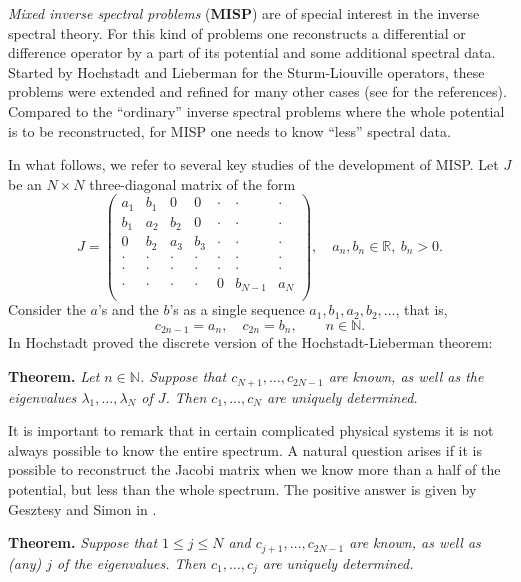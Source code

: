 \documentclass{amsart}
\begin{document}
{\it Mixed inverse spectral problems} ({\bf MISP}) are of special
interest in the inverse spectral theory. For this kind of problems
one reconstructs a differential or difference operator by a part of
its potential and some additional spectral data. Started by
Hochstadt and Lieberman \cite{HL} for the Sturm-Liouville operators,
these problems were extended and refined for many other cases (see
\cite{Chu-Golub} for the references). Compared to the ``ordinary''
inverse spectral problems where the whole potential is to be
reconstructed, for MISP one needs to know ``less'' spectral data.

In what follows, we refer to several key studies of the
development of MISP. Let $J$ be an $N\times N$ three-diagonal
matrix of the form
$$
J=\begin{pmatrix} a_1 & b_1 & 0 & 0 & \cdot & \cdot & \cdot \\
b_1 & a_2 & b_2 & 0 & \cdot & \cdot & \cdot \\
0 & b_2 & a_3 & b_3 & \cdot & \cdot & \cdot \\
\cdot & \cdot & \cdot & \cdot & \cdot & \cdot & \cdot \\
\cdot & \cdot & \cdot & \cdot & \cdot & \cdot & \cdot \\
\cdot & \cdot & \cdot & \cdot & 0 & b_{N-1} & a_N\\
\end{pmatrix}, \quad a_n, b_n \in {{\mathbb R}}, \ b_n>0.
$$
Consider the $a$'s and the $b$'s as a single sequence $a_1, b_1,
a_2, b_2, \ldots$, that is,
$$ c_{2n-1}=a_n, \quad c_{2n}=b_n, \qquad n\in {{\mathbb N}}.
$$
In \cite{H} Hochstadt proved the discrete version of the
Hochstadt-Lieberman theorem:

\medskip

{\bf Theorem.} {\it Let $n\in {{\mathbb N}}$. Suppose that
$c_{N+1},\ldots,c_{2N-1}$ are known, as well as the eigenvalues
${\lambda}_1,\ldots,{\lambda}_N$ of $J$. Then $c_1,\ldots,c_N$ are uniquely
determined.}

\medskip

It is important to remark that in certain complicated physical
systems it is not always possible to know the entire spectrum. A
natural question arises if it is possible to reconstruct the Jacobi
matrix when we know more than a half of the potential, but less than
the whole spectrum. The positive answer is given by Gesztesy and
Simon in \cite{GS}.

\medskip

{\bf Theorem.} {\it Suppose that $1\leq j\leq N$ and
$c_{j+1},\ldots,c_{2N-1}$ are known, as well as (any) $j$ of the
eigenvalues. Then $c_1,\ldots,c_j$ are uniquely determined.}
\end{document}
